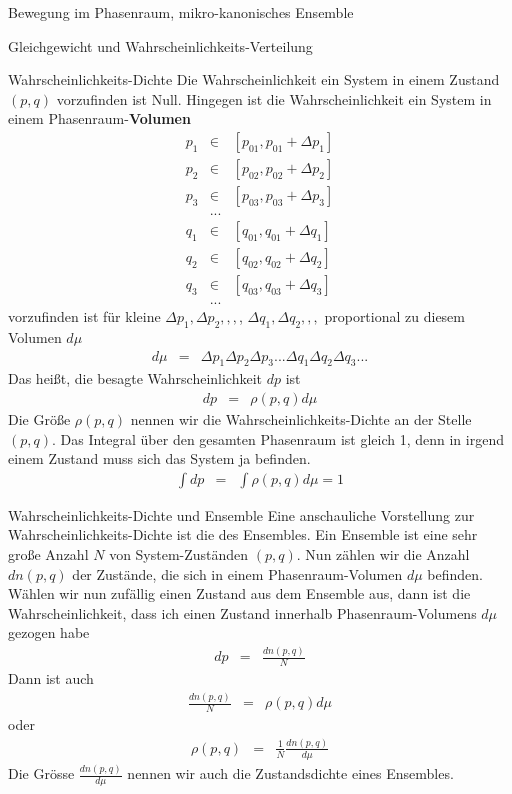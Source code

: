 \begin{chapter}{\titlestr}
\begin{section}{Bewegung im Phasenraum, mikro-kanonisches Ensemble}
\begin{subsection}{Gleichgewicht und Wahrscheinlichkeits-Verteilung}
\begin{subsubsection}{Wahrscheinlichkeits-Dichte}
Die Wahrscheinlichkeit ein System in einem Zustand $(p,q)$ vorzufinden ist Null. Hingegen ist die Wahrscheinlichkeit
ein System in einem Phasenraum-\textbf{Volumen}
\begin{eqnarray*}
p_1 &\in& [p_{01},p_{01}+\Delta p_1]\\
p_2 &\in& [p_{02},p_{02}+\Delta p_2]\\
p_3 &\in& [p_{03},p_{03}+\Delta p_3]\\
&...&\\
q_1 &\in& [q_{01},q_{01}+\Delta q_1]\\
q_2 &\in& [q_{02},q_{02}+\Delta q_2]\\
q_3 &\in& [q_{03},q_{03}+\Delta q_3]\\
&...&
\end{eqnarray*}
vorzufinden ist für kleine $\Delta p_1, \Delta p_2,,,$, $\Delta q_1, \Delta q_2,,,$ proportional zu diesem Volumen $d\mu$
\begin{eqnarray*}
d\mu &=& \Delta p_1\Delta p_2\Delta p_3...\Delta q_1\Delta q_2\Delta q_3...
\end{eqnarray*}
Das heißt, die besagte Wahrscheinlichkeit $dp$ ist
\begin{eqnarray*}
dp &=& \rho(p,q)d\mu
\end{eqnarray*}
Die Größe $\rho(p,q)$ nennen wir die Wahrscheinlichkeits-Dichte an der Stelle $(p,q)$.
Das Integral über den gesamten Phasenraum ist gleich 1, denn in irgend einem Zustand muss sich das System ja befinden.
\begin{eqnarray*}
\int dp &=& \int \rho(p,q)d\mu =1
\end{eqnarray*}
\end{subsubsection}

\begin{subsubsection}{Wahrscheinlichkeits-Dichte und Ensemble}
Eine anschauliche Vorstellung zur Wahrscheinlichkeits-Dichte ist die des Ensembles. Ein Ensemble ist eine sehr große Anzahl $N$
von System-Zuständen $(p,q)$. Nun zählen wir die Anzahl $dn(p,q)$ der Zustände, die sich in einem Phasenraum-Volumen $d\mu$ befinden. Wählen wir nun zufällig einen Zustand aus dem Ensemble aus, dann ist die Wahrscheinlichkeit, dass ich einen Zustand innerhalb
Phasenraum-Volumens $d\mu$ gezogen habe
\begin{eqnarray*}
dp &=& \frac{dn(p,q)}{N}
\end{eqnarray*}
Dann ist auch
\begin{eqnarray*}
\frac{dn(p,q)}{N} &=&\rho(p,q)d\mu
\end{eqnarray*}
oder
\begin{eqnarray*}
\rho(p,q) &=& \frac{1}{N}\frac{dn(p,q)}{d\mu}
\end{eqnarray*}
Die Grösse $\frac{dn(p,q)}{d\mu}$ nennen wir auch die Zustandsdichte eines Ensembles.
\end{subsubsection}


\end{subsection}
\end{section}
\end{chapter}
